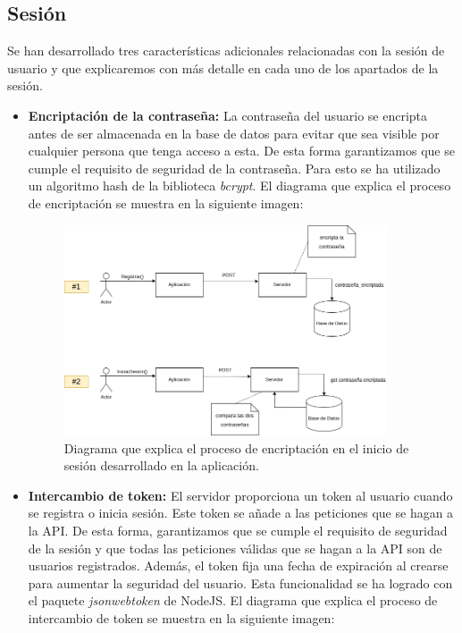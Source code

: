 \subsection{Sesión}
\label{sec:sesion}
Se han desarrollado tres características adicionales relacionadas con la sesión de usuario y que explicaremos con más detalle en cada uno de los apartados de la sesión.
\begin{itemize}
    \item \textbf{Encriptación de la contraseña:} La contraseña del usuario se encripta antes de ser almacenada en la base de datos para evitar que sea visible por cualquier persona que tenga acceso a esta. De esta forma
    garantizamos que se cumple el requisito de seguridad de la contraseña. Para esto se ha utilizado un algoritmo hash de la biblioteca \textit{bcrypt}.
    El diagrama que explica el proceso de encriptación se muestra en la siguiente imagen:
    \begin{figure}[H]
      \centering
      \includegraphics[width=0.9\textwidth]{imagenes/c7/logindiag.png}
      \caption{Diagrama que explica el proceso de encriptación en el inicio de sesión desarrollado en la aplicación.}
      \label{fig:login}
    \end{figure}

    \item \textbf{Intercambio de token:} El servidor proporciona un token al usuario cuando se registra o inicia sesión. Este token se añade a las peticiones que se hagan a la API. De esta forma, garantizamos que se cumple el requisito de seguridad de la sesión y 
    que todas las peticiones válidas que se hagan a la API son de usuarios registrados. Además, el token fija una fecha de expiración al crearse para aumentar la seguridad del usuario. Esta funcionalidad se ha logrado con el paquete \textit{jsonwebtoken} de NodeJS.
    El diagrama que explica el proceso de intercambio de token se muestra en la siguiente imagen:


\end{itemize}
